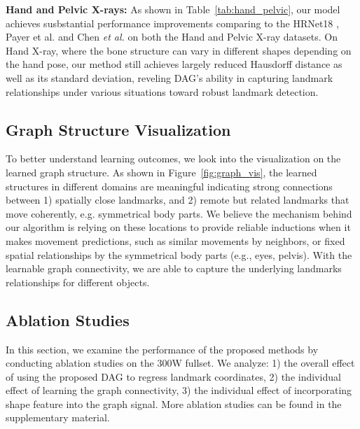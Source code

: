 \documentclass[runningheads]{llncs}
\begin{document}
\noindent\textbf{Hand and Pelvic X-rays:} As shown in Table~\ref{tab:hand_pelvic}, our model achieves susbstantial performance improvements comparing to the HRNet18 \cite{sun2019deep}, Payer {et al.} \cite{Payer2019a} and Chen \textit{et al.} \cite{chen2019cephalometric} on both the Hand and Pelvic X-ray datasets. On Hand X-ray, where the bone structure can vary in different shapes depending on the hand pose, our method still achieves largely reduced Hausdorff distance as well as its standard deviation, reveling DAG's ability in capturing landmark relationships under various situations toward robust landmark detection.

\noindent\subsection{Graph Structure Visualization}
To better understand learning outcomes, we look into the visualization on the learned graph structure. As shown in Figure~\ref{fig:graph_vis}, the learned structures in different domains are meaningful indicating strong connections between 1) spatially close landmarks, and 2) remote but related landmarks that move coherently, e.g. symmetrical body parts. We believe the mechanism behind our algorithm is relying on these locations to provide reliable inductions when it makes movement predictions, such as similar movements by neighbors, or fixed spatial relationships by the symmetrical body parts (e.g., eyes, pelvis). With the learnable graph connectivity, we are able to capture the underlying landmarks relationships for different objects.

\subsection{Ablation Studies} 
In this section, we examine the performance of the proposed methods by conducting ablation studies on the 300W fullset. We analyze: 1) the overall effect of using the proposed DAG to regress landmark coordinates, 2) the individual effect of learning the graph connectivity, 3) the individual effect of incorporating shape feature into the graph signal. More ablation studies can be found in the supplementary material.
\end{document}
